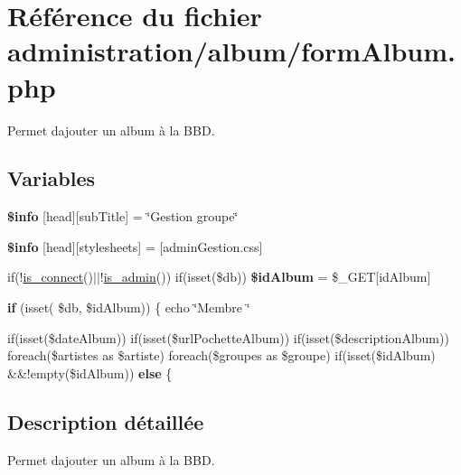 \hypertarget{formAlbum_8php}{}\section{Référence du fichier administration/album/form\+Album.php}
\label{formAlbum_8php}


Permet d\textquotesingle{}ajouter un album à la B\+BD.  


\subsection*{Variables}
\begin{DoxyCompactItemize}
\item 
\mbox{\label{formAlbum_8php_a024f87f9bf4f3b33710e2e7ff8f60823}} 
{\bfseries \$info} \mbox{[}\textquotesingle{}head\textquotesingle{}\mbox{]}\mbox{[}\textquotesingle{}sub\+Title\textquotesingle{}\mbox{]} = \char`\"{}Gestion groupe\char`\"{}
\item 
\mbox{\label{formAlbum_8php_af6044c8bf78ebc8c58057e14d7738bbd}} 
{\bfseries \$info} \mbox{[}\textquotesingle{}head\textquotesingle{}\mbox{]}\mbox{[}\textquotesingle{}stylesheets\textquotesingle{}\mbox{]} = \mbox{[}\textquotesingle{}admin\+Gestion.\+css\textquotesingle{}\mbox{]}
\item 
\mbox{\label{formAlbum_8php_a21da4200f0b046e795a16fdb62497b8e}} 
if(!\hyperlink{fonctionCompte_8php_a2fe594e0482307b8729ea37780d6f74b}{is\+\_\+connect}()$\vert$$\vert$!\hyperlink{fonctionCompte_8php_a0b327581800dba50ad70720e23ae2ed2}{is\+\_\+admin}()) if(isset(\$db)) {\bfseries \$id\+Album} = \$\+\_\+\+G\+ET\mbox{[}\textquotesingle{}id\+Album\textquotesingle{}\mbox{]}
\item 
\mbox{\label{formAlbum_8php_a2b2bb17b85ece548c13dc4cfd49e064f}} 
{\bfseries if} (isset( \$db, \$id\+Album)) \{ echo \char`\"{}Membre \char`\"{}
\item 
\mbox{\label{formAlbum_8php_af3b63517e631e466b1127fdb60b7b57f}} 
if(isset(\$date\+Album)) if(isset(\$url\+Pochette\+Album)) if(isset(\$description\+Album)) foreach(\$artistes as \$artiste) foreach(\$groupes as \$groupe) if(isset(\$id\+Album) \&\&!empty(\$id\+Album)) {\bfseries else} \{
\end{DoxyCompactItemize}


\subsection{Description détaillée}
Permet d\textquotesingle{}ajouter un album à la B\+BD. 

